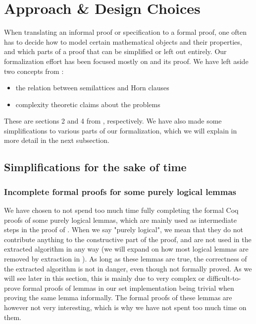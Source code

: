 \chapter{Approach \& Design Choices}
\label{ch:approach_design_choices}

When translating an informal proof or specification to a formal proof,
one often has to decide how to model certain mathematical objects and their properties,
and which parts of a proof that can be simplified or left out entirely.
Our formalization effort has been focused mostly on  and its proof.
We have left aside two concepts from \cite{mbezem}:

\begin{itemize}
    \item the relation between semilattices and Horn clauses
    \item complexity theoretic claims about the problems
\end{itemize}

These are sections 2 and 4 from \cite{mbezem}, respectively.
We have also made some simplifications to various parts of our formalization,
which we will explain in more detail in the next subsection.

\section{Simplifications for the sake of time}
\label{sec:simplifications}

\subsection{Incomplete formal proofs for some purely logical lemmas}
\label{ssec:incomplete_formal_proofs_for_some_purely_logical_lemmas}

We have chosen to not spend too much time fully completing the formal Coq proofs of some purely logical lemmas,
which are mainly used as intermediate steps in the proof of .
When we say "purely logical", we mean that they do not contribute anything to the
constructive part of the proof, and are not used in the extracted algorithm in any way
(we will expand on how most logical lemmas are removed by extraction in ).
As long as these lemmas are true, the correctness of the extracted algorithm is not in danger,
even though not formally proved.
As we will see later in this section, this is mainly due to
very complex or difficult-to-prove formal proofs of lemmas in our set implementation
being trivial when proving the same lemma informally.
The formal proofs of these lemmas are however not very interesting,
which is why we have not spent too much time on them.

